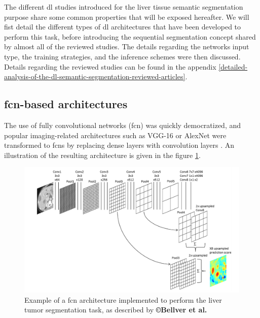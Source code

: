 The different \ac{dl} studies introduced for the liver tissue semantic
segmentation purpose share some common properties that will be exposed
hereafter. We will fist detail the different types of \ac{dl} architectures that have been developed to perform this task, before introducing the sequential segmentation concept shared by almost all of the reviewed studies. The details regarding the networks input type, the training strategies, and the inference schemes were then discussed.
Details regarding the reviewed studies can be found in the appendix \ref{detailed-analysis-of-the-dl-semantic-segmentation-reviewed-articles}.

\subsection{\ac{fcn}-based architectures}

The use of fully convolutional networks (\ac{fcn}) was quickly democratized,
and popular imaging-related architectures such as VGG-16 or AlexNet
were transformed to \ac{fcn}s by replacing dense layers with convolution
layers \cite{Ben-Cohen, Bellver2017}. An illustration of the resulting architecture is given in the figure \ref{Bellver_FCN}. 

\begin{figure}[th!]
	\centering
	\includegraphics[width=0.7\linewidth]{images/image3}
	\caption{Example of a \ac{fcn} architecture implemented to perform the liver tumor segmentation task, as described by \textbf{©Bellver et al. \cite{Bellver2017}}}
	\label{Bellver_FCN}
\end{figure}


